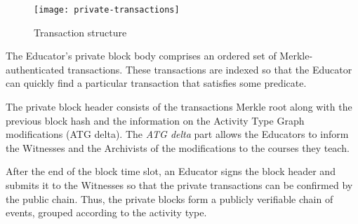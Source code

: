 \begin{figure}[ht]
\centering
\texttt{[image: private-transactions]}
\caption{Transaction structure}
\label{fig:private-transactions}
\end{figure}



The Educator's private block body comprises an ordered set of Merkle-authenticated transactions. These transactions are indexed so that the Educator can quickly find a particular transaction that satisfies some predicate.

The private block header consists of the transactions Merkle root along with the previous block hash and the information on the Activity Type Graph modifications (ATG delta). The \textit{ATG delta} part allows the Educators to inform the Witnesses and the Archivists of the modifications to the courses they teach.

After the end of the block time slot, an Educator signs the block header and submits it to the Witnesses so that the private transactions can be confirmed by the public chain. Thus, the private blocks form a publicly verifiable chain of events, grouped according to the activity type.
